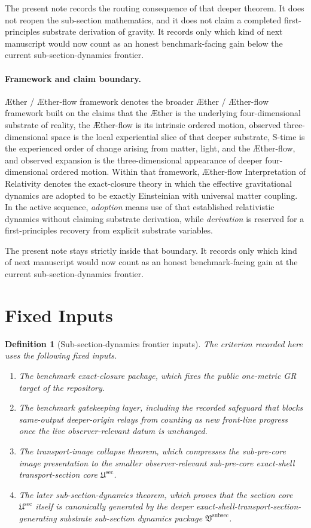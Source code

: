 \documentclass[11pt]{article}
\newcommand{\Aether}{\AE{}ther}
\newcommand{\Aflow}{\AE{}ther-flow}
\newcommand{\TheoryName}{\Aflow{} Interpretation of Relativity}
\newcommand{\TheoryProgram}{\Aether{} / \Aflow{} framework}
\newcommand{\SubPreSectionCore}{\mathfrak U^{\mathrm{sec}}}
\newcommand{\SubSectionPackage}{\mathfrak V^{\mathrm{subsec}}}
\newtheorem{definition}{Definition}
\begin{document}
The present note records the routing consequence of that deeper theorem. It does not reopen the sub-section mathematics, and it does not claim a completed first-principles substrate derivation of gravity. It records only which kind of next manuscript would now count as an honest benchmark-facing gain below the current sub-section-dynamics frontier.

\paragraph{Framework and claim boundary.}
\TheoryProgram{} denotes the broader \Aether{} / \Aflow{} framework built on the claims that the \Aether{} is the underlying four-dimensional substrate of reality, the \Aflow{} is its intrinsic ordered motion, observed three-dimensional space is the local experiential slice of that deeper substrate, S-time is the experienced order of change arising from matter, light, and the \Aflow{}, and observed expansion is the three-dimensional appearance of deeper four-dimensional ordered motion. Within that framework, \TheoryName{} denotes the exact-closure theory in which the effective gravitational dynamics are adopted to be exactly Einsteinian with universal matter coupling. In the active sequence, \emph{adoption} means use of that established relativistic dynamics without claiming substrate derivation, while \emph{derivation} is reserved for a first-principles recovery from explicit substrate variables.

The present note stays strictly inside that boundary. It records only which kind of next manuscript would now count as an honest benchmark-facing gain at the current sub-section-dynamics frontier.

\section{Fixed Inputs}

\begin{definition}[Sub-section-dynamics frontier inputs]
The criterion recorded here uses the following fixed inputs.
\begin{enumerate}
    \item The benchmark exact-closure package, which fixes the public one-metric GR target of the repository.
    \item The benchmark gatekeeping layer, including the recorded safeguard that blocks same-output deeper-origin relays from counting as new front-line progress once the live observer-relevant datum is unchanged.
    \item The transport-image collapse theorem, which compresses the sub-pre-core image presentation to the smaller observer-relevant sub-pre-core exact-shell transport-section core \(\SubPreSectionCore\).
    \item The later sub-section-dynamics theorem, which proves that the section core \(\SubPreSectionCore\) itself is canonically generated by the deeper exact-shell-transport-section-generating substrate sub-section dynamics package \(\SubSectionPackage\).
\end{enumerate}
\end{definition}
\end{document}
